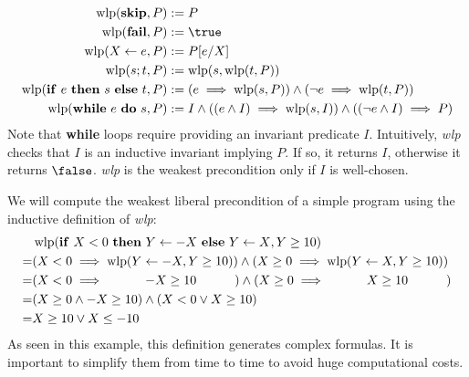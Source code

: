 \documentclass[toc, titlepaged]{../cs-classes/cs-classes}
\DeclareMathOperator{\wlp}{wlp}
\begin{document}
\begin{definition}
    \begin{equation*}
        \begin{aligned}
            \wlp(\textnormal{\bf skip}, P) &:= P\\
            \wlp(\textnormal{\bf fail}, P) &:= \true\\
            \wlp(X\leftarrow e, P) &:= P[e/X]\\
            \wlp(s;t, P) &:= \wlp(s, \wlp(t, P))\\
            \wlp(\textnormal{\textbf{if} $e$ \textbf{then} $s$ \textbf{else} $t$}, P) &:= (e\implies\wlp(s, P)) \land (\lnot e\implies\wlp(t, P))\\
            \wlp(\textnormal{\textbf{while} $e$ \textbf{do} $s$}, P) &:= I\land((e\land I)\implies\wlp(s, I)) \land ((\lnot e\land I)\implies P)
        \end{aligned}
    \end{equation*}
    Note that \textbf{while} loops require providing an invariant predicate $I$. Intuitively, \emph{wlp} checks that $I$ is an inductive invariant implying $P$. If so, it returns $I$, otherwise it returns $\false$. \emph{wlp} is the weakest precondition only if $I$ is well-chosen.
\end{definition}

\begin{example}
    We will compute the weakest liberal precondition of a simple program using the inductive definition of \emph{wlp}:
    \begin{equation*}
        \begin{aligned}
            &\wlp(\textnormal{\textbf{if} $X<0$ \textbf{then} $Y\leftarrow-X$ \textbf{else} $Y\leftarrow X$}, Y\geq10)\\
            = &(X<0\implies\wlp(Y\leftarrow-X, Y\geq10)) \land (X\geq0 \implies \wlp(Y\leftarrow X, Y\geq10))\\
            = &(X<0\implies \quad\qquad -X\geq10 \quad\qquad) \land (X\geq0\implies \quad\qquad X\geq10\qquad\quad)\\
            = &(X\geq0\land-X\geq10) \land (X<0\lor X\geq10)\\
            = &X\geq10\lor X\leq-10
        \end{aligned}
    \end{equation*}
    As seen in this example, this definition generates complex formulas. It is important to simplify them from time to time to avoid huge computational costs.
\end{example}
\end{document}
